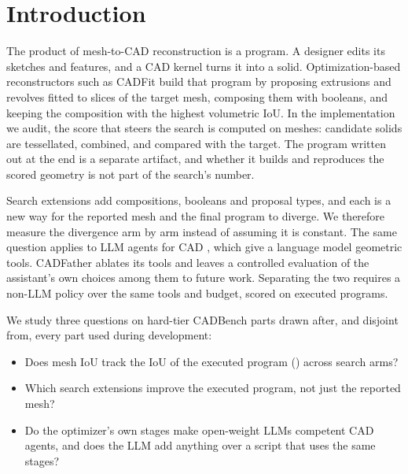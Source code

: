 \section{Introduction}
\label{sec:intro}

The product of mesh-to-CAD reconstruction is a program. A designer edits its sketches and features, and a CAD kernel turns it into a solid. Optimization-based reconstructors such as CADFit \citep{nehme2026cadfit} build that program by proposing extrusions and revolves fitted to slices of the target mesh, composing them with booleans, and keeping the composition with the highest volumetric IoU. In the implementation we audit, the score that steers the search is computed on meshes: candidate solids are tessellated, combined, and compared with the target. The program written out at the end is a separate artifact, and whether it builds and reproduces the scored geometry is not part of the search's number.

Search extensions add compositions, booleans and proposal types, and each is a new way for the reported mesh and the final program to diverge. We therefore measure the divergence arm by arm instead of assuming it is constant. The same question applies to LLM agents for CAD \citep{mallis2025cadassistant,savrasov2026cadfather}, which give a language model geometric tools. CADFather \citep{savrasov2026cadfather} ablates its tools and leaves a controlled evaluation of the assistant's own choices among them to future work. Separating the two requires a non-LLM policy over the same tools and budget, scored on executed programs.

We study three questions on \nFresh{} hard-tier CADBench parts \citep{doris2026cadbench} drawn after, and disjoint from, every part used during development:
\begin{itemize}
\item[\textbf{Q1}] Does mesh IoU track the IoU of the executed program (\iouc) across search arms?
\item[\textbf{Q2}] Which search extensions improve the executed program, not just the reported mesh?
\item[\textbf{Q3}] Do the optimizer's own stages make open-weight LLMs competent CAD agents, and does the LLM add anything over a script that uses the same stages?
\end{itemize}

